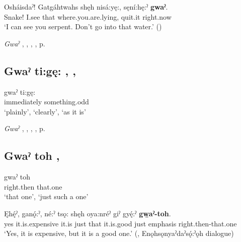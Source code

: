 \ea
\label{ex:gpar91}
\gll Osháisdaˀ! Gatgáhtwahs shęh nisá:yę:, sęní:hę:ˀ \textbf{gwaˀ}.\\
Snake! I.see that where.you.are.lying, quit.it right.now\\
\glt ‘I can see you serpent. Don’t go into that water.’ (\cite{carrier_legends_2013})
\z

\begin{CayugaRelated}
\item \textit{Gwaˀ} , , , , p. \pageref{p:[gwaˀ] ‘immediately’}
\end{CayugaRelated}

\subsection*{\textbf{Gwaˀ ti:gę:} , , } \label{p:[gwaˀ ti:gę:]}

\ea
\label{ex:gpar92}
\gll gwaˀ ti:gę:\\
immediately something.odd\\
\glt ‘plainly’, ‘clearly’, ‘as it is’
\z

\begin{CayugaRelated}
\item \textit{Gwaˀ} , , , , p. \pageref{p:[gwaˀ] ‘immediately’}
\end{CayugaRelated}

\subsection*{\textbf{Gwaˀ toh} , } \label{p:[gwaˀ toh]}

\ea
\label{ex:gpar93}
\gll gwaˀ toh\\
right.then that.one\\
\glt ‘that one’, ‘just such a one’
\z

\ea
\label{ex:gpar94}
\gll Ęhę́ˀ, ganǫ́:ˀ, né:ˀ tsǫ: shęh oya:nréˀ giˀ gyę́:ˀ \textbf{gw̱aˀ-toh}.\\
yes it.is.expensive it.is just that it.is.good just emphasis right.then-that.one\\
\glt ‘Yes, it is expensive, but it is a good one.’ (\cite[159]{mithun_watewayestanih_1984}, Enǫhsǫnyaˀdaˀsǫ́:ˀǫh dialogue)
\z

